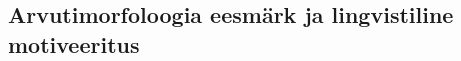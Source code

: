 \documentclass[12pt,a4paper]{article}
\begin{document}
% 
% 
% 



\subsection{Arvutimorfoloogia eesmärk ja lingvistiline motiveeritus}

\end{document}
